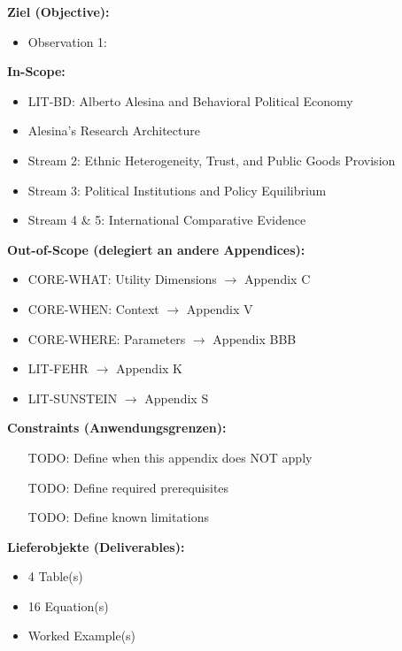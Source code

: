 \begin{tcolorbox}[
    colback=orange!5!white,
    colframe=orange!75!black,
    title={\textbf{Appendix Scope: Ziel / In-Scope / Out-of-Scope / Constraints}},
    fonttitle=\bfseries
]

\textbf{Ziel (Objective):}
\begin{itemize}[nosep]
    \item Observation 1:
\end{itemize}

\textbf{In-Scope:}
\begin{itemize}[nosep]
    \item LIT-BD: Alberto Alesina and Behavioral Political Economy
    \item Alesina's Research Architecture
    \item Stream 2: Ethnic Heterogeneity, Trust, and Public Goods Provision
    \item Stream 3: Political Institutions and Policy Equilibrium
    \item Stream 4 \& 5: International Comparative Evidence
\end{itemize}

\textbf{Out-of-Scope (delegiert an andere Appendices):}
\begin{itemize}[nosep]
    \item CORE-WHAT: Utility Dimensions $\rightarrow$ Appendix C
    \item CORE-WHEN: Context $\rightarrow$ Appendix V
    \item CORE-WHERE: Parameters $\rightarrow$ Appendix BBB
    \item LIT-FEHR $\rightarrow$ Appendix K
    \item LIT-SUNSTEIN $\rightarrow$ Appendix S
\end{itemize}

\textbf{Constraints (Anwendungsgrenzen):}
\begin{itemize}[nosep]
    \item [TODO: Define when this appendix does NOT apply]
    \item [TODO: Define required prerequisites]
    \item [TODO: Define known limitations]
\end{itemize}

\textbf{Lieferobjekte (Deliverables):}
\begin{itemize}[nosep]
    \item 4 Table(s)
    \item 16 Equation(s)
    \item Worked Example(s)
\end{itemize}

\end{tcolorbox}



